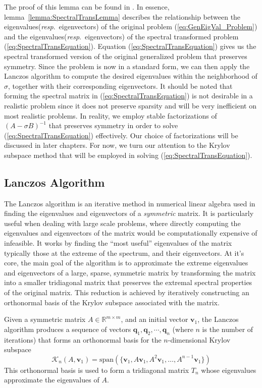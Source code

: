The proof of this lemma can be found in \cite{stewart2024spectraltransformationdensesymmetric}. In essence, lemma~\ref{lemma:SpectralTransLemma} describes the relationship between the eigenvalues(\textit{resp}.\ eigenvectors) of the original problem (\ref{eq:GenEigVal_Problem}) and the eigenvalues(\textit{resp}.\ eigenvectors) of the spectral transformed problem (\ref{eq:SpectralTransEquation}). Equation (\ref{eq:SpectralTransEquation}) gives us the spectral transformed version of the original generalized problem that preserves symmetry. Since the problem is now in a standard form, we can then apply the Lanczos algorithm to compute the desired eigenvalues within the neighborhood of $\sigma$, together with their corresponding eigenvectors. It should be noted that forming the spectral matrix in (\ref{eq:SpectralTransEquation}) is not desirable in a realistic problem since it does not preserve sparsity and will be very inefficient on most realistic problems. In reality, we employ stable factorizations of $(A-\sigma B)^{-1}$ that preserves symmetry in order to solve (\ref{eq:SpectralTransEquation}) effectively. Our choice of factorizations will be discussed in later chapters. For now, we turn our attention to the Krylov subspace method that will be employed in solving (\ref{eq:SpectralTransEquation}).

\subsection{Lanczos Algorithm}\label{sec:LanczosAlgorithm}

The Lanczos algorithm is an iterative method in numerical linear algebra used in finding the eigenvalues and eigenvectors of a \textit{symmetric} matrix. It is particularly useful when dealing with large scale problems, where directly computing the eigenvalues and eigenvectors of the matrix would be computationally expensive of infeasible. It works by finding the ``most useful'' eigenvalues of the matrix \textemdash\, typically those at the extreme of the spectrum, and their eigenvectors. At it's core, the main goal of the algorithm is to approximate the extreme eigenvalues and eigenvectors of a large, sparse, symmetric matrix by transforming the matrix into a smaller tridiagonal matrix that preserves the extremal spectral properties of the original matrix. This reduction is achieved by iteratively constructing an orthonormal basis of the Krylov subspace associated with the matrix.

Given a symmetric matrix $A \in \mathbb{R}^{m\times m}$, and an initial vector $\mathbf{v}_1$, the Lanczos algorithm produces a sequence of vectors $\mathbf{q}_1, \mathbf{q}_2, \cdots, \mathbf{q}_n$ (where $n$ is the number of iterations) that forms an orthonormal basis for the $n$-dimensional Krylov subspace
\begin{equation}\label{eq:KrylovSubspaceDefinition}
       \mathcal{K}_n(A, \mathbf{v}_1) = \text{span}(\{\mathbf{v}_1, A\mathbf{v}_1, A^2\mathbf{v}_1, \ldots, A^{n-1}\mathbf{v}_1\})
\end{equation}
This orthonormal basis is used to form a tridiagonal matrix $T_n$ whose eigenvalues approximate the eigenvalues of $A$.

